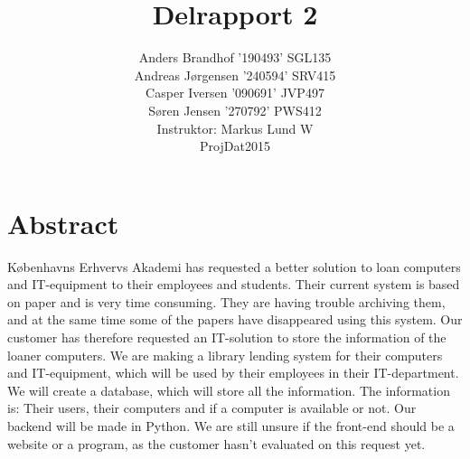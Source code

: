 \documentclass[a4paper]{article}
\title{Delrapport 2}
\author{Anders Brandhof '190493' SGL135 \\ Andreas Jørgensen '240594' SRV415 \\ Casper Iversen '090691' JVP497 \\ Søren Jensen '270792' PWS412 \\
Instruktor: Markus Lund W\\
ProjDat2015}
\begin{document}
\maketitle

\pagebreak

\tableofcontents

\newpage

\section{Abstract}
Københavns Erhvervs Akademi has requested a better solution to loan computers and IT-equipment to their employees and students. Their current system is based on paper and is very time consuming. They are having trouble archiving them, and at the same time some of the papers have disappeared using this system. Our customer has therefore requested an IT-solution to store the information of the loaner computers. We are making a library lending system for their computers and IT-equipment, which will be used by their employees in their IT-department. We will create a database, which will store all the information. The information is: Their users, their computers and if a computer is available or not. Our backend will be made in Python. We are still unsure if the front-end should be a website or a program, as the customer hasn’t evaluated on this request yet. \\
\end{document}
